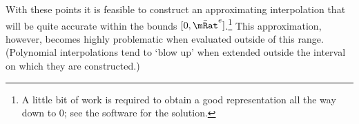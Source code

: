 \documentclass{\handout}
\begin{document}
\begin{CDCPrivate}
With these points it is feasible to construct an approximating interpolation that will 
be quite accurate within the bounds $[0,\bar{\mRat}^{e}]$.\footnote{A little bit of work is required to obtain a good representation all the way down to 0; see the software for the solution.}  This approximation, however, becomes highly problematic when evaluated outside of this range.  (Polynomial
interpolations tend to `blow up' when extended outside the interval on which they are constructed.) 

\begin{comment} %
Recognizing that $\lim_{\mRat \rightarrow \infty} \MPCFunc(\mRat)$ is a constant, analysis of \eqref{eq:kappaPExpr} leads 
to the conclusion that the limiting functional form of $\MPCFunc^{\prime}(\mRat)$ is linear in $\mRat^{-1}$; that is, for some $\chi_{0}$ %
\begin{equation}\begin{gathered}\begin{aligned}
  \lim_{\mRat \rightarrow \infty} -\cFunc^{\prime\prime}(\mRat) & \approx   - \chi_{0}/\mRat  \label{eq:cPPlimInf}
,
\end{aligned}\end{gathered}\end{equation}
which leads to the following scheme for approximating the limiting consumption function.


\end{comment}
\end{CDCPrivate}
\end{document}
